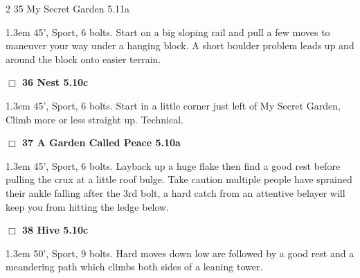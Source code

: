 \begin{multicols}{2}
{{{35 My Secret Garden 5.11a  
}}}
\begin{adjustwidth}{1.3em}{}			
45', Sport, 6 bolts. Start on a big sloping rail and pull a few moves to maneuver your way under a hanging block. A short boulder problem leads up and around the block onto easier terrain.
\end{adjustwidth}
\needspace{2em}
\label{rt:Nest}
\colorbox{RoyalBlue!20}{
\parbox{0.95\linewidth}{
\hspace{-1ex}\textbf{$\Box$
36 Nest 5.10c  
}}}
\begin{adjustwidth}{1.3em}{}			
45', Sport, 6 bolts. Start in a little corner just left of My Secret Garden, Climb more or less straight up. Technical.
\end{adjustwidth}
\needspace{2em}
\label{rt:A Garden Called Peace}
\colorbox{RoyalBlue!20}{
\parbox{0.95\linewidth}{
\hspace{-1ex}\textbf{$\Box$
37 A Garden Called Peace 5.10a  
}}}
\begin{adjustwidth}{1.3em}{}			
45', Sport, 6 bolts. Layback up a huge flake then find a good rest before pulling the crux at a little roof bulge. Take caution multiple people have sprained their ankle falling after the 3rd bolt, a hard catch from an attentive belayer will keep you from hitting the ledge below.
\end{adjustwidth}
\needspace{2em}
\label{rt:Hive}
\colorbox{RoyalBlue!20}{
\parbox{0.95\linewidth}{
\hspace{-1ex}\textbf{$\Box$
38 Hive 5.10c  
}}}
\begin{adjustwidth}{1.3em}{}			
50', Sport, 9 bolts. Hard moves down low are followed by a good rest and a meandering path which climbs both sides of a leaning tower.
\end{adjustwidth}
	\end{multicols}
\newpage
